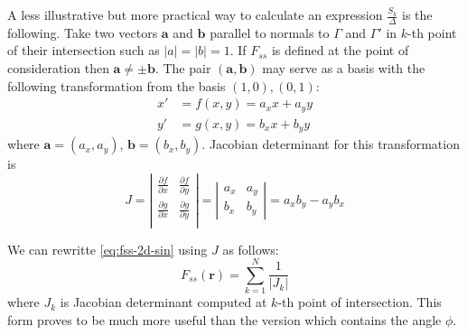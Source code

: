 \documentclass[reprint,amsmath,amssymb,aps,pre,showkeys,showpacs]{revtex4-1}
\begin{document}
A less illustrative but more practical way to calculate an expression
$\frac{S_k}{\Delta}$ is the following. Take two vectors $\bm{a}$ and $\bm{b}$
parallel to normals to $\Gamma$ and $\Gamma'$ in $k$-th point of their
intersection such as $|a| = |b| = 1$. If $F_{ss}$ is defined at the point of
consideration then $\bm{a} \ne \pm \bm{b}$. The pair $(\bm{a}, \bm{b})$ may
serve as a basis with the following transformation from the basis
$(1,0), (0,1)$:
\begin{align*}
  x' &= f(x, y) = a_x x + a_y y \\
  y' &= g(x, y) = b_x x + b_y y
\end{align*}
where $\bm{a} = (a_x, a_y)$, $\bm{b} = (b_x, b_y)$. Jacobian determinant for
this transformation is
\begin{equation*}
  J = \left|
  \begin{array}{cc}
    \frac{\partial f}{\partial x} & \frac{\partial f}{\partial y} \\
    \frac{\partial g}{\partial x} & \frac{\partial g}{\partial y} \\
  \end{array}
  \right| =
  \left|
  \begin{array}{cc}
    a_x & a_y \\
    b_x & b_y
  \end{array}
  \right| = a_x b_y - a_y b_x
\end{equation*}

We can rewritte \cref{eq:fss-2d-sin} using $J$ as follows:
\begin{equation}
  F_{ss}(\bm{r}) = \sum_{k=1}^N \frac{1}{|J_k|} \label{eq:fss-2d}
\end{equation}
where $J_k$ is Jacobian determinant computed at $k$-th point of
intersection. This form proves to be much more useful than the version which
contains the angle $\phi$.
\end{document}
